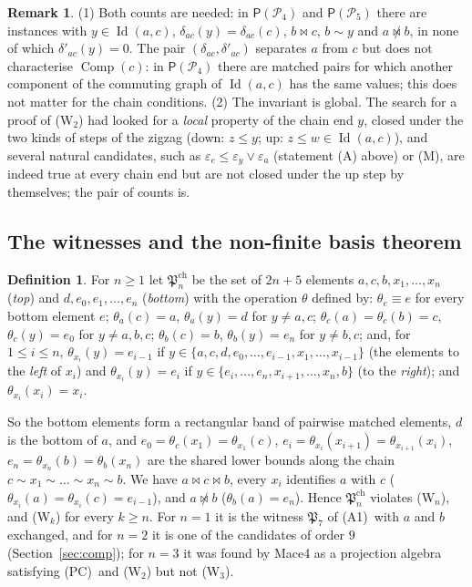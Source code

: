 \documentclass[11pt]{amsart}
\theoremstyle{definition}
\newtheorem{definition}[theorem]{Definition}
\newtheorem{remark}[theorem]{Remark}
\renewcommand{\P}{\mathcal{P}}      %
\newcommand{\PA}{\mathsf{P}}         %
\newcommand{\Id}{\operatorname{Id}}
\newcommand{\Comp}{\operatorname{Comp}}
\newcommand{\mt}{\bowtie}      %
\newcommand{\Qone}{\textup{(PC)}}     %
\newcommand{\Rcond}{\textup{(A1)}}     %
\newcommand{\Wn}[1][n]{\textup{(W$_{#1}$)}}
\begin{document}
\begin{remark}\label{rem:chain}
(1) Both counts are needed: in $\PA(\P_4)$ and $\PA(\P_5)$ there are instances with $y\in\Id(a,c)$, $\delta_{ac}(y)=\delta_{ac}(c)$, $b\mt c$, $b\sim y$ and $a\not\mt b$, in none of which $\delta'_{ac}(y)=0$. The pair $(\delta_{ac},\delta'_{ac})$ separates $a$ from $c$ but does not characterise $\Comp(c)$: in $\PA(\P_4)$ there are matched pairs for which another component of the commuting graph of $\Id(a,c)$ has the same values; this does not matter for the chain conditions. (2) The invariant is global. The search for a proof of \Wn[2] had looked for a \emph{local} property of the chain end $y$, closed under the two kinds of steps of the zigzag (down: $z\le y$; up: $z\le w\in\Id(a,c)$), and several natural candidates, such as $\varepsilon_c\le\varepsilon_y\vee\varepsilon_a$ (statement (A) above) or (M), are indeed true at every chain end but are not closed under the up step by themselves; the pair of counts is.
\end{remark}

\subsection{The witnesses and the non-finite basis theorem}\label{subsec:chainwit}

\begin{definition}\label{def:chainwit}
For $n\ge1$ let $\mathfrak P^{\mathrm{ch}}_n$ be the set of $2n+5$ elements $a,c,b,x_1,\dots,x_n$ (\emph{top}) and $d,e_0,e_1,\dots,e_n$ (\emph{bottom}) with the operation $\theta$ defined by: $\theta_e\equiv e$ for every bottom element $e$; $\theta_a(c)=a$, $\theta_a(y)=d$ for $y\ne a,c$; $\theta_c(a)=\theta_c(b)=c$, $\theta_c(y)=e_0$ for $y\ne a,b,c$; $\theta_b(c)=b$, $\theta_b(y)=e_n$ for $y\ne b,c$; and, for $1\le i\le n$, $\theta_{x_i}(y)=e_{i-1}$ if $y\in\{a,c,d,e_0,\dots,e_{i-1},x_1,\dots,x_{i-1}\}$ (the elements to the \emph{left} of $x_i$) and $\theta_{x_i}(y)=e_i$ if $y\in\{e_i,\dots,e_n,x_{i+1},\dots,x_n,b\}$ (to the \emph{right}); and $\theta_{x_i}(x_i)=x_i$.
\end{definition}

So the bottom elements form a rectangular band of pairwise matched elements, $d$ is the bottom of $a$, and $e_0=\theta_c(x_1)=\theta_{x_1}(c)$, $e_i=\theta_{x_i}(x_{i+1})=\theta_{x_{i+1}}(x_i)$, $e_n=\theta_{x_n}(b)=\theta_b(x_n)$ are the shared lower bounds along the chain $c\sim x_1\sim\dots\sim x_n\sim b$. We have $a\mt c\mt b$, every $x_i$ identifies $a$ with $c$ ($\theta_{x_i}(a)=\theta_{x_i}(c)=e_{i-1}$), and $a\not\mt b$ ($\theta_b(a)=e_n$). Hence $\mathfrak P^{\mathrm{ch}}_n$ violates \Wn, and \Wn[k] for every $k\ge n$. For $n=1$ it is the witness $\mathfrak P_7$ of \Rcond\ with $a$ and $b$ exchanged, and for $n=2$ it is one of the candidates of order $9$ (Section~\ref{sec:comp}); for $n=3$ it was found by Mace4 as a projection algebra satisfying \Qone\ and \Wn[2] but not \Wn[3].
\end{document}
